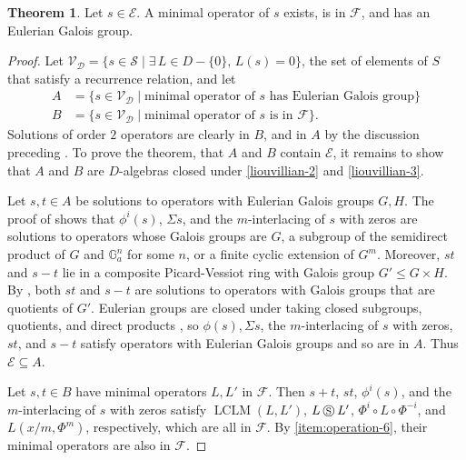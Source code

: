 \documentclass[11pt,reqno]{amsart}
\theoremstyle{definition}
\newtheorem{theorem}{Theorem}[section]
\DeclareMathOperator{\LCLM}{LCLM}
\newcommand{\cs}{\mathbin{\circledS}}
\begin{document}
\begin{theorem}
    \label{thm:eulerian-group}
    Let $s\in \mathcal{E}$. A minimal operator of $s$ exists, is in $\mathcal{F}$, and has an Eulerian Galois group.
\end{theorem}
\begin{proof}

Let $\mathcal{V_{D}}=\{s \in \mathcal{S} \mid \exists \, L \in D - \{0\},\,L(s)=0\}$, the set of elements of $S$ that satisfy a recurrence relation, and let
     \begin{equation*}
        \begin{aligned}
            A &=\{s\in \mathcal{V_{D}}\mid \text{minimal operator of }s\text{ has Eulerian Galois group}\}\\
            B&=\{s\in \mathcal{V_{D}}\mid \text{minimal operator of }s\text{ is in } \mathcal{F}\}.
        \end{aligned}
    \end{equation*}
    Solutions of order $2$ operators are clearly in $B$, and in $A$ by the discussion preceding .
    To prove the theorem, that $A$ and $B$ contain $\mathcal{E}$, it remains to show that $A$ and $B$ are $D$-algebras closed under \eqref{liouvillian-2} and \eqref{liouvillian-3}.

    
    Let $s,t\in A$ be solutions to operators with Eulerian Galois groups $G,H$.
    The proof of \cite[Theorem 3.4]{hendricks1999solving} shows that $\phi^i (s)$, $\Sigma s$, and the $m$-interlacing of $s$ with zeros are solutions to operators whose Galois groups are $G$, a subgroup of the semidirect product of $G$ and $\mathbb{G}_{a}^{n}$ for some $n$, or a finite cyclic extension of $G^{m}$.
    Moreover, $st$ and $s-t$ lie in a composite Picard-Vessiot ring with Galois group $G'\le G\times H$.
    By \cite[Lemma A.8]{hendricks1999solving}, both $st$ and $s-t$ are solutions to operators with Galois groups that are quotients of $G'$.
    Eulerian groups are closed under taking closed subgroups, quotients, and direct products \cite[Lemma 2.2]{singer1985solving}, 
    so $\phi(s), \Sigma s$, the $m$-interlacing of $s$ with zeros, $st$, and $s-t$ satisfy operators with Eulerian Galois groups and so are in $A$. Thus $\mathcal{E} \subseteq A$.

    Let $s,t\in B$ have minimal operators $L,L'$ in $\mathcal{F}$. 
    Then $s+t$, $st$, $\phi^{i}(s)$, and the $m$-interlacing of $s$ with zeros satisfy $\LCLM(L,L')$, $L\cs L'$, $\Phi^{i}\circ L\circ \Phi^{-i}$, and $L(x/m,\Phi^{m})$, respectively, which are all in $\mathcal{F}$. 
    By \ref{item:operation-6}, their minimal operators are also in $\mathcal{F}$.
\end{proof}
\end{document}

